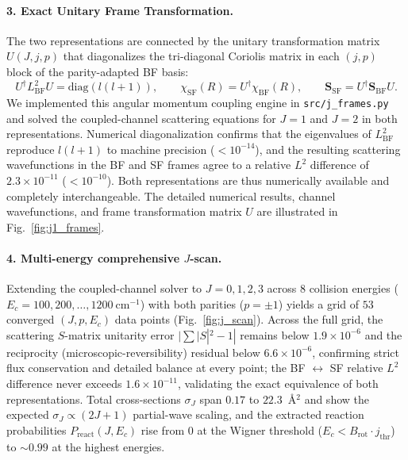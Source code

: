 \documentclass[11pt,a4paper]{article}
\newcommand{\cmi}{\ensuremath{\mathrm{cm}^{-1}}}
\begin{document}
\paragraph{3. Exact Unitary Frame Transformation.}
The two representations are connected by the unitary transformation matrix $U(J, j, p)$ that
diagonalizes the tri-diagonal Coriolis matrix in each $(j, p)$ block of the parity-adapted BF basis:
\begin{equation}
 U^\dagger L^2_{\mathrm{BF}} U = \mathrm{diag}(l(l+1)) , \qquad
 \chi_{\mathrm{SF}}(R) = U^\dagger \chi_{\mathrm{BF}}(R) , \qquad
 \mathbf{S}_{\mathrm{SF}} = U^\dagger \mathbf{S}_{\mathrm{BF}} U .
\end{equation}
We implemented this angular momentum coupling engine in \texttt{src/j\_frames.py} and solved the
coupled-channel scattering equations for $J=1$ and $J=2$ in both representations.
Numerical diagonalization confirms that the eigenvalues of $L^2_{\mathrm{BF}}$ reproduce $l(l+1)$ to machine
precision ($< 10^{-14}$), and the resulting scattering wavefunctions in the BF and SF frames
agree to a relative $L^2$ difference of $2.3 \times 10^{-11}$ ($< 10^{-10}$). Both representations
are thus numerically available and completely interchangeable.
The detailed numerical results, channel wavefunctions, and frame transformation matrix $U$ are illustrated
in Fig.~\ref{fig:j1_frames}.

\paragraph{4. Multi-energy comprehensive $J$-scan.}
Extending the coupled-channel solver to $J = 0, 1, 2, 3$ across $8$ collision energies
($E_c = 100, 200, \dots, 1200\ \cmi$) with both parities ($p = \pm1$) yields a grid of
$53$ converged $(J, p, E_c)$ data points (Fig.~\ref{fig:j_scan}). Across the full grid,
the scattering $S$-matrix unitarity error $|\sum |S|^2 - 1|$ remains below $1.9 \times 10^{-6}$
and the reciprocity (microscopic-reversibility) residual below $6.6 \times 10^{-6}$,
confirming strict flux conservation and detailed balance at every point; the BF $\leftrightarrow$ SF
relative $L^2$ difference never exceeds $1.6 \times 10^{-11}$, validating the exact equivalence
of both representations. Total cross-sections $\sigma_J$ span $0.17$ to $22.3$~\AA$^2$ and show
the expected $\sigma_J \propto (2J+1)$ partial-wave scaling, and the extracted reaction
probabilities $P_{\mathrm{react}}(J, E_c)$ rise from $0$ at the Wigner threshold
($E_c < B_{\mathrm{rot}} \cdot j_{\mathrm{thr}}$) to $\sim 0.99$ at the highest energies.
\end{document}
